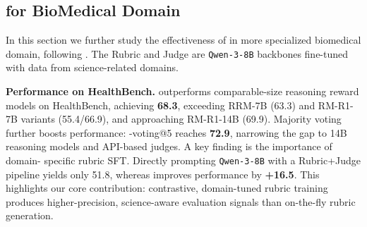 




\subsection{{\name} for BioMedical Domain}

In this section we further study the effectiveness of {\name} in more specialized biomedical domain, following \citet{arora2025healthbench}.
The Rubric and Judge are \texttt{Qwen-3-8B} backbones fine-tuned with {\dataset} data from science-related domains.

\noindent \textbf{Performance on HealthBench.}
{\name} outperforms comparable-size reasoning reward models on HealthBench, achieving \textbf{68.3}, exceeding RRM-7B (63.3) and RM-R1-7B variants (55.4/66.9), and approaching RM-R1-14B (69.9).
Majority voting further boosts performance: {\name}-{voting@5} reaches \textbf{72.9}, narrowing the gap to 14B reasoning models and API-based judges. 
A key finding is the importance of domain- specific rubric SFT. 
Directly prompting \texttt{Qwen-3-8B} with a Rubric+Judge pipeline yields only 51.8, whereas {\name} improves performance by \textbf{+16.5}. 
This highlights our core contribution: {contrastive, domain-tuned rubric training produces higher-precision, science-aware evaluation signals than on-the-fly rubric generation}.


